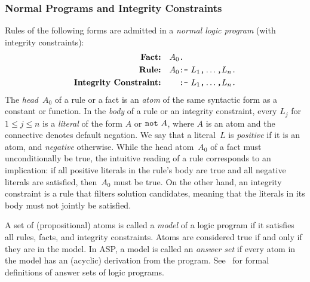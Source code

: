 \subsubsection{Normal Programs and Integrity Constraints}\label{subsec:gringo:normal}
Rules of the following forms are admitted in a
\emph{normal logic program} (with integrity constraints):
\begin{align*}
\textbf{Fact:} & \quad A_0\texttt{.} \\
\textbf{Rule:} & \quad A_0\texttt{:-}~L_1\text{\texttt{,}}\dots\text{\texttt{,}}L_n\texttt{.} \\
\textbf{Integrity Constraint:} & \quad \phantom{A_0}\texttt{:-}~L_1\texttt{,}\dots\texttt{,}L_n\texttt{.}
\end{align*}
%
%
%
%
The \emph{head}~$A_0$ of a rule or a fact is an \emph{atom} of the same
syntactic form as a constant or function.
%
%
In the \emph{body} of a rule or an integrity constraint,
every $L_j$ for $1\leq j\leq n$ is a \emph{literal} of the form $A$ or $\texttt{not}~A$,
where $A$ is an atom and
the connective  denotes default negation.
%
%
%
%
We say that a literal~$L$ is \emph{positive} if it is an atom,
and \emph{negative} otherwise.
While the head atom~$A_0$ of a fact must unconditionally be true,
the intuitive reading of a rule corresponds to an implication:
if all positive literals in the rule's body are true and all negative
literals are satisfied, then~$A_0$ must be true.
On the other hand, an integrity constraint is a rule that filters solution candidates,
meaning that the literals in its body must not jointly be satisfied.

A set of (propositional) atoms is called a \emph{model} of a logic program if it satisfies all rules, facts, and integrity constraints.
Atoms are considered true if and only if they are in the model.
In ASP, a model is called an \emph{answer set} if every atom in the model has an (acyclic) derivation from the program.
%
See~\cite{gellif88b,gelfond08a,lifschitz08a} for formal definitions of answer sets of logic programs.

